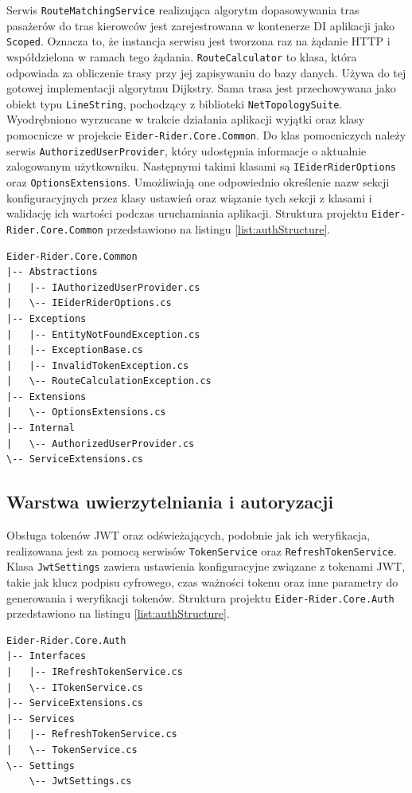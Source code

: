 Serwis \texttt{RouteMatchingService} realizująca algorytm dopasowywania tras pasażerów do tras kierowców jest zarejestrowana w kontenerze DI aplikacji jako \texttt{Scoped}.
Oznacza to, że instancja serwisu jest tworzona raz na żądanie HTTP i współdzielona w ramach tego żądania.
\texttt{RouteCalculator} to klasa, która odpowiada za obliczenie trasy przy jej zapisywaniu do bazy danych. 
Używa do tej gotowej implementacji algorytmu Dijkstry.
Sama trasa jest przechowywana jako obiekt typu \texttt{LineString}, pochodzący z biblioteki \texttt{NetTopologySuite}.
Wyodrębniono wyrzucane w trakcie działania aplikacji wyjątki oraz klasy pomocnicze w projekcie \texttt{Eider-Rider.Core.Common}.
Do klas pomocniczych należy serwis \texttt{AuthorizedUserProvider}, który udostępnia informacje o aktualnie zalogowanym użytkowniku.
Następnymi takimi klasami są \texttt{IEiderRiderOptions} oraz \texttt{OptionsExtensions}.
Umożliwiają one odpowiednio określenie nazw sekcji konfiguracyjnych przez klasy ustawień oraz wiązanie tych sekcji z klasami i walidację ich wartości podczas uruchamiania aplikacji.
Struktura projektu \texttt{Eider-Rider.Core.Common} przedstawiono na listingu \ref{list:authStructure}.
\begin{lstlisting}[label=list:commonsStructure,caption=Struktura projektu wspólnych klas pomocniczych,style=folderview]
Eider-Rider.Core.Common
|-- Abstractions
|   |-- IAuthorizedUserProvider.cs
|   \-- IEiderRiderOptions.cs
|-- Exceptions
|   |-- EntityNotFoundException.cs
|   |-- ExceptionBase.cs
|   |-- InvalidTokenException.cs
|   \-- RouteCalculationException.cs
|-- Extensions
|   \-- OptionsExtensions.cs
|-- Internal
|   \-- AuthorizedUserProvider.cs
\-- ServiceExtensions.cs
\end{lstlisting}
\subsection{Warstwa uwierzytelniania i autoryzacji}
Obsługa tokenów JWT oraz odświeżających, podobnie jak ich weryfikacja, realizowana jest za pomocą serwisów \texttt{TokenService} oraz \texttt{RefreshTokenService}.
Klasa \texttt{JwtSettings} zawiera ustawienia konfiguracyjne związane z tokenami JWT, takie jak klucz podpisu cyfrowego, czas ważności tokenu oraz inne parametry do generowania i weryfikacji tokenów.
Struktura projektu \texttt{Eider-Rider.Core.Auth} przedstawiono na listingu \ref{list:authStructure}.

\begin{lstlisting}[label=list:authStructure,caption=Struktura projektu uwierzytelniania,style=folderview]
Eider-Rider.Core.Auth
|-- Interfaces
|   |-- IRefreshTokenService.cs
|   \-- ITokenService.cs
|-- ServiceExtensions.cs
|-- Services
|   |-- RefreshTokenService.cs
|   \-- TokenService.cs
\-- Settings
    \-- JwtSettings.cs
\end{lstlisting}

